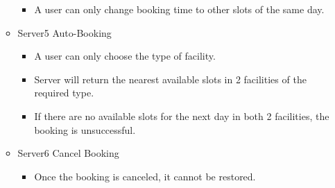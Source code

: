 \begin{spacing}{1}
\begin{enumerate}
\begin{itemize}
        \begin{itemize}
            \item A user can only change booking time to other slots of the same day.
        \end{itemize}
        \item Server5 Auto-Booking
        \begin{itemize}
            \item A user can only choose the type of facility. 
            \item Server will return the nearest available slots in 2 facilities of the required type.
            \item If there are no available slots for the next day in both 2 facilities, the booking is unsuccessful.
        \end{itemize}
        \item Server6 Cancel Booking
        \begin{itemize}
            \item Once the booking is canceled, it cannot be restored.
        \end{itemize}
   \end{itemize}
   
\end{enumerate}




\end{spacing}
\newpage
